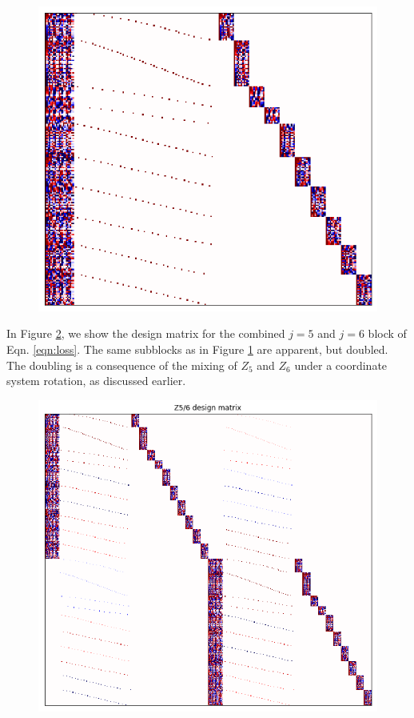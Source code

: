 \documentclass{article}
\begin{document}
\begin{figure}
    \includegraphics{design4.png}

    \caption{}

    \label{fig:design4}
\end{figure}

In Figure \ref{fig:design56}, we show the design matrix for the combined $j=5$
and $j=6$ block of Eqn. \ref{eqn:loss}.  The same subblocks as in Figure
\ref{fig:design4} are apparent, but doubled.  The doubling is a consequence of
the mixing of $Z_5$ and $Z_6$ under a coordinate system rotation, as discussed
earlier.

\begin{figure}
    \includegraphics{design56.png}

    \caption{}

    \label{fig:design56}
\end{figure}
\end{document}
